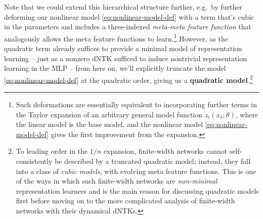  

















Note that we could extend this hierarchical structure further, e.g.~by further deforming our nonlinear model \eqref{eq:nonlinear-model-def} with a term that's cubic in the parameters and includes a three-indexed \emph{meta-meta feature function} that analogously allows the meta feature functions to learn.\footnote{Such deformations are essentially equivalent to incorporating further terms in the Taylor expansion of an arbitrary general model function $z_i(x_{\delta}; \theta)$, where the linear model is the base model, and the nonlinear model \eqref{eq:nonlinear-model-def} gives the first improvement from the expansion.}
However, as the quadratic term already suffices to provide a minimal model of representation learning -- just as a nonzero dNTK sufficed to induce nontrivial representation learning in the MLP --
from here on, we'll explicitly truncate the model \eqref{eq:nonlinear-model-def} at the quadratic order, giving us a \textbf{quadratic model}.\footnote{
To leading order in the $1/n$ expansion,
finite-width networks cannot self-consistently be described by a truncated quadratic model; instead, they fall into a class of  \emph{cubic models}, with evolving meta feature functions. This is one of the ways in which such finite-width networks are \emph{non-minimal} representation learners and is the main reason for discussing quadratic models first before moving on to the more complicated analysis of finite-width networks with their dynamical dNTKs.
}







